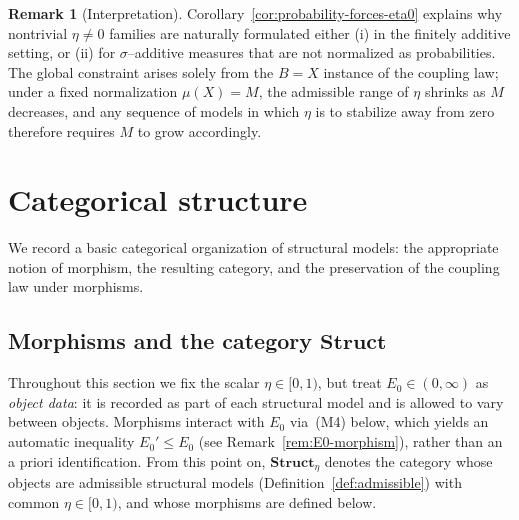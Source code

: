 \documentclass[11pt]{article}
\numberwithin{equation}{section}
\theoremstyle{definition}
\newtheorem{remark}[theorem]{Remark}
\begin{document}
\begin{remark}[Interpretation]
Corollary~\ref{cor:probability-forces-eta0} explains why nontrivial $\eta\neq 0$ families are naturally formulated
either (i) in the finitely additive setting, or (ii) for $\sigma$--additive measures that are not normalized as probabilities.
The global constraint arises solely from the $B=X$ instance of the coupling law; under a fixed normalization $\mu(X)=M$, the admissible range of $\eta$ shrinks as $M$ decreases, and any sequence of models in which $\eta$ is to stabilize away from zero therefore requires $M$ to grow accordingly.
\end{remark}


\section{Categorical structure}\label{sec:category}

We record a basic categorical organization of structural models: the appropriate notion of morphism, the resulting category, and the preservation of the coupling law under morphisms.

\subsection{\texorpdfstring{Morphisms and the category $\mathbf{Struct}$}{Morphisms and the category Struct}}

Throughout this section we fix the scalar $\eta\in[0,1)$, but treat $E_0\in(0,\infty)$ as \emph{object data}: it is recorded as part of each structural model and is allowed to vary between objects. Morphisms interact with $E_0$ via~(M4) below, which yields an automatic inequality $E_0'\le E_0$ (see Remark~\ref{rem:E0-morphism}), rather than an a priori identification. From this point on, $\mathbf{Struct}_{\eta}$ denotes the category whose objects are admissible structural models (Definition~\ref{def:admissible}) with common $\eta\in[0,1)$, and whose morphisms are defined below.
\end{document}
